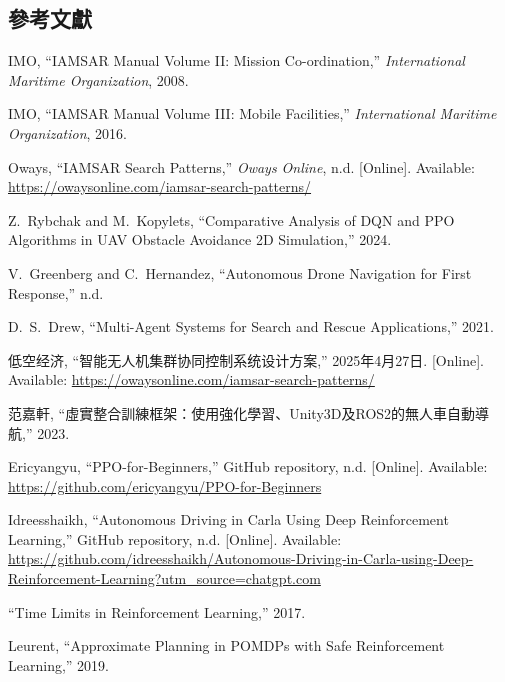 \documentclass[12pt,a4paper]{article}
\begin{document}
\begin{thebibliography}{9}
\section{參考文獻}

IMO,
``IAMSAR Manual Volume II: Mission Co-ordination,''
\textit{International Maritime Organization},
2008.

IMO,
``IAMSAR Manual Volume III: Mobile Facilities,''
\textit{International Maritime Organization},
2016.

Oways,
``IAMSAR Search Patterns,''
\textit{Oways Online},
n.d.
[Online]. Available: \url{https://owaysonline.com/iamsar-search-patterns/}

Z.~Rybchak and M.~Kopylets,
``Comparative Analysis of DQN and PPO Algorithms in UAV Obstacle Avoidance 2D Simulation,''
2024.

V.~Greenberg and C.~Hernandez,
``Autonomous Drone Navigation for First Response,''
n.d.

D.~S.~Drew,
``Multi-Agent Systems for Search and Rescue Applications,''
2021.

低空经济,
``智能无人机集群协同控制系统设计方案,''
2025年4月27日.
[Online]. Available: \url{https://owaysonline.com/iamsar-search-patterns/}

范嘉軒,
``虛實整合訓練框架：使用強化學習、Unity3D及ROS2的無人車自動導航,''
2023.

Ericyangyu,
``PPO-for-Beginners,''
GitHub repository,
n.d.
[Online]. Available: \url{https://github.com/ericyangyu/PPO-for-Beginners}


Idreesshaikh,
``Autonomous Driving in Carla Using Deep Reinforcement Learning,''
GitHub repository,
n.d.
[Online]. Available: \url{https://github.com/idreesshaikh/Autonomous-Driving-in-Carla-using-Deep-Reinforcement-Learning?utm\_source=chatgpt.com}


``Time Limits in Reinforcement Learning,''
2017.

Leurent,
``Approximate Planning in POMDPs with Safe Reinforcement Learning,''
2019.

\end{thebibliography}
\end{document}
